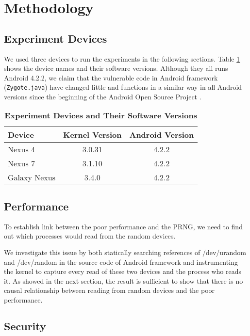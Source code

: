 \section{Methodology}

\subsection{Experiment Devices}

We used three devices to run the experiments in the following sections. Table \ref{tbldevice} shows the device names and their software versions. Although they all runs Android 4.2.2, we claim that the vulnerable code in Android framework (\verb|Zygote.java|) have changed little and functions in a similar way in all Android versions since the beginning of the Android Open Source Project \cite{zygotejava}. 

\begin{table}
\begin{center}
\begin{tabular}{|l|c|c|}
\hline
\bf Device & \bf Kernel Version & \bf Android Version \\
\hline
Nexus 4 & 3.0.31 & 4.2.2 \\
\hline
Nexus 7 & 3.1.10 & 4.2.2 \\
\hline
Galaxy Nexus & 3.4.0 & 4.2.2 \\
\hline

\end{tabular}
\end{center}
\caption{{\bf Experiment Devices and Their Software Versions} }
\label{tbldevice}
\end{table}


\subsection{Performance}

To establish link between the poor performance and the PRNG, we need to find out which processes would read from the random devices.

We investigate this issue by both statically searching references of /dev/urandom and /dev/random in the source code of Android framework and instrumenting the kernel to capture every read of these two devices and the process who reads it. As showed in the next section, the result is sufficient to show that there is no causal relationship between reading from random devices and the poor performance.

\subsection{Security}

